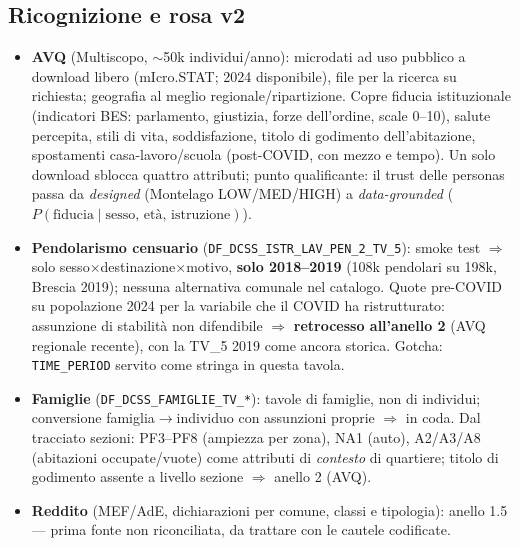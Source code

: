 \documentclass[11pt,a4paper]{article}
\newcommand{\code}[1]{\texttt{#1}}
\newcommand{\flow}[1]{\texttt{\small #1}}
\begin{document}
\subsection{Ricognizione e rosa v2}
\begin{itemize}[leftmargin=*,itemsep=1pt]
  \item \textbf{AVQ} (Multiscopo, $\sim$50k individui/anno): microdati ad uso
  pubblico a download libero (mIcro.STAT; 2024 disponibile), file per la
  ricerca su richiesta; geografia al meglio regionale/ripartizione. Copre
  fiducia istituzionale (indicatori BES: parlamento, giustizia, forze
  dell'ordine, scale 0--10), salute percepita, stili di vita, soddisfazione,
  titolo di godimento dell'abitazione, spostamenti casa-lavoro/scuola
  (post-COVID, con mezzo e tempo). Un solo download sblocca quattro
  attributi; punto qualificante: il trust delle personas passa da
  \emph{designed} (Montelago LOW/MED/HIGH) a \emph{data-grounded}
  ($P(\text{fiducia}\mid\text{sesso, et\`a, istruzione})$).
  \item \textbf{Pendolarismo censuario} (\flow{DF\_DCSS\_ISTR\_LAV\_PEN\_2\_TV\_5}):
  smoke test $\Rightarrow$ solo sesso$\times$destinazione$\times$motivo,
  \textbf{solo 2018--2019} (108k pendolari su 198k, Brescia 2019); nessuna
  alternativa comunale nel catalogo. Quote pre-COVID su popolazione 2024
  per la variabile che il COVID ha ristrutturato: assunzione di stabilit\`a
  non difendibile $\Rightarrow$ \textbf{retrocesso all'anello 2} (AVQ
  regionale recente), con la TV\_5 2019 come ancora storica. Gotcha:
  \code{TIME\_PERIOD} servito come stringa in questa tavola.
  \item \textbf{Famiglie} (\flow{DF\_DCSS\_FAMIGLIE\_TV\_*}): tavole di
  famiglie, non di individui; conversione famiglia$\to$individuo con
  assunzioni proprie $\Rightarrow$ in coda. Dal tracciato sezioni: PF3--PF8
  (ampiezza per zona), NA1 (auto), A2/A3/A8 (abitazioni occupate/vuote) come
  attributi di \emph{contesto} di quartiere; titolo di godimento assente a
  livello sezione $\Rightarrow$ anello 2 (AVQ).
  \item \textbf{Reddito} (MEF/AdE, dichiarazioni per comune, classi e
  tipologia): anello 1.5 --- prima fonte non riconciliata, da trattare con
  le cautele codificate.
\end{itemize}

\end{document}
